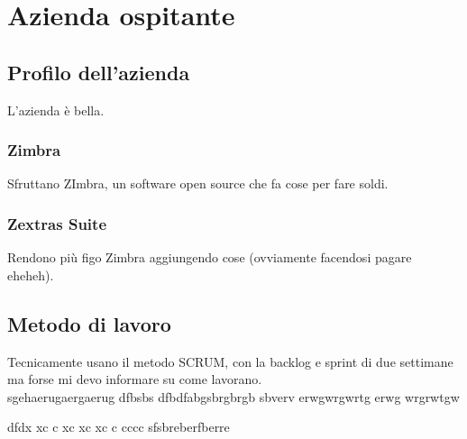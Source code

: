 \chapter{Azienda ospitante}

\section{Profilo dell'azienda}
L'azienda è bella.

\subsection{Zimbra}
Sfruttano ZImbra, un software open source che fa cose per fare soldi.

\subsection{Zextras Suite}
Rendono più figo Zimbra aggiungendo cose (ovviamente facendosi pagare eheheh).

\section{Metodo di lavoro}
Tecnicamente usano il metodo SCRUM, con la backlog e sprint di due settimane ma forse mi devo informare su come lavorano. \\



sgehaerugaergaerug  dfbsbs dfbdfabgsbrgbrgb sbverv
 erwgwrgwrtg 
 erwg wrgrwtgw

dfdx xc c xc xc xc c
cccc
sfsbreberfberre

